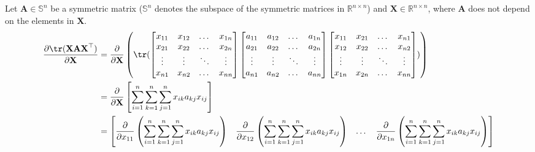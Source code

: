 Let \(\mathbf{A} \in \mathbb{S}^{n}\) be a symmetric matrix (\(\mathbb{S}^{n}\) denotes the subspace of the symmetric matrices in \(\mathbb{R}^{n\times n}\)) and \(\mathbf{X} \in \mathbb{R}^{n\times n}\), where \(\mathbf{A}\) does not depend on the elements in \(\mathbf{X}\).
\begin{align*}
    \dfrac{\partial \tr(\mathbf{XAX}^\top)}{\partial \mathbf{X}} &= \dfrac{\partial}{\partial \mathbf{X}} \left(
    \tr(
        \begin{bmatrix}
            x_{11} & x_{12} & \dots & x_{1n} \\
            x_{21} & x_{22} & \dots & x_{2n} \\
            \vdots & \vdots & \ddots & \vdots \\
            x_{n1} & x_{n2} & \dots & x_{nn} \\
        \end{bmatrix}
        \begin{bmatrix}
            a_{11} & a_{12} & \dots & a_{1n} \\
            a_{21} & a_{22} & \dots & a_{2n} \\
            \vdots & \vdots & \ddots & \vdots \\
            a_{n1} & a_{n2} & \dots & a_{nn} \\
        \end{bmatrix}
    \begin{bmatrix}
        x_{11} & x_{21} & \dots & x_{n1} \\
        x_{12} & x_{22} & \dots & x_{n2} \\
        \vdots & \vdots & \ddots & \vdots \\
        x_{1n} & x_{2n} & \dots & x_{nn} \\
    \end{bmatrix}) \right) \\
    &= \dfrac{\partial}{\partial \mathbf{X}} \left[ \sum_{i = 1}^{n} \sum_{k = 1}^{n} \sum_{j = 1}^{n} x_{ik}a_{kj}x_{ij} \right] \\
    &= \begin{bmatrix}
        \displaystyle \dfrac{\partial}{\partial x_{11}} \left( \sum_{i = 1}^{n} \sum_{k = 1}^{n} \sum_{j = 1}^{n} x_{ik}a_{kj}x_{ij} \right) & 
        \displaystyle \dfrac{\partial}{\partial x_{12}} \left( \sum_{i = 1}^{n} \sum_{k = 1}^{n} \sum_{j = 1}^{n} x_{ik}a_{kj}x_{ij} \right) & 
        \dots & 
        \displaystyle \dfrac{\partial}{\partial x_{1n}} \left( \sum_{i = 1}^{n} \sum_{k = 1}^{n} \sum_{j = 1}^{n} x_{ik}a_{kj}x_{ij} \right) \\

\end{bmatrix}
\end{align*}
